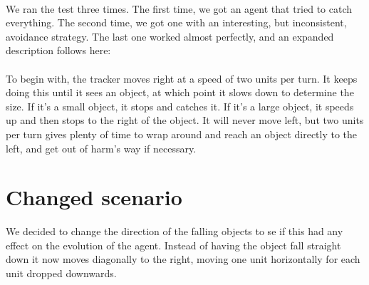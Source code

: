\documentclass[a4paper,12pt]{article}
\begin{document}
\paragraph{}We ran the test three times. The first time, we got an agent that tried to catch everything. The second time, we got one with an interesting, but inconsistent, avoidance strategy. The last one worked almost perfectly, and an expanded description follows here:
\paragraph{}To begin with, the tracker moves right at a speed of two units per turn. It keeps doing this until it sees an object, at which point it slows down to determine the size. If it's a small object, it stops and catches it. If it's a large object, it speeds up and then stops to the right of the object. It will never move left, but two units per turn gives plenty of time to wrap around and reach an object directly to the left, and get out of harm's way if necessary.

\section{Changed scenario}
We decided to change the direction of the falling objects to se if this had any effect on the evolution of the agent. Instead of having the object fall straight down it now moves diagonally to the right, moving one unit horizontally for each unit dropped downwards. \\
\end{document}

